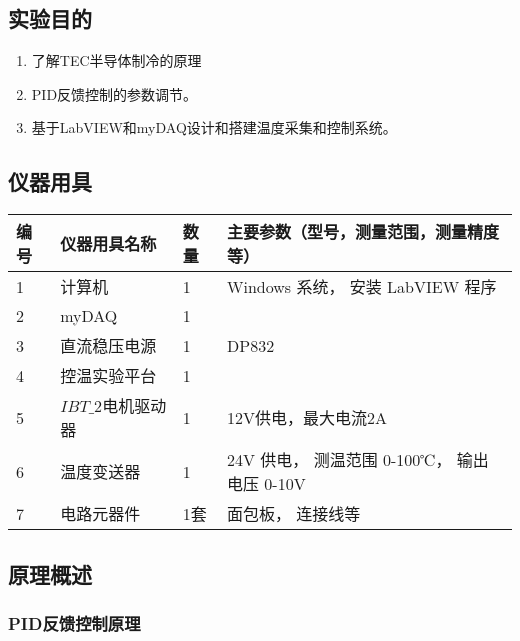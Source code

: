 \documentclass[dvipsnames, svgnames,a4paper,11pt]{article}
\begin{document}
\subsection{实验目的}
\begin{enumerate}
	\item 了解TEC半导体制冷的原理
	\item PID反馈控制的参数调节。
	\item 基于LabVIEW和myDAQ设计和搭建温度采集和控制系统。
	
	
\end{enumerate}

\subsection{仪器用具}
\begin{table}[htbp]
	\centering
	\renewcommand\arraystretch{1.6}
	\begin{tabular}{p{}|p{}|p{}|p{}}
		\hline
		编号& 仪器用具名称 			& 数量 		&  主要参数（型号，测量范围，测量精度等） \\
		\hline
		1	&	计算机 				&1 			& Windows 系统， 安装 LabVIEW 程序\\

		2	&	myDAQ 				&1 			& 		 \\
		
		3	&	直流稳压电源 		& 1 		&	DP832 \\
		
		4	&	控温实验平台		&1 			&   \\
		
		5	&	$IBT\_2$电机驱动器	&	1 		& 12V供电，最大电流2A \\

		6	&	温度变送器			&	1 		&		24V 供电， 测温范围 0-100℃， 输出电压 0-10V \\

		7	&	电路元器件			&	1套 	& 面包板， 连接线等 \\
		\hline
	\end{tabular}
\end{table}

\subsection{原理概述}

\subsubsection{PID反馈控制原理}
\end{document}
